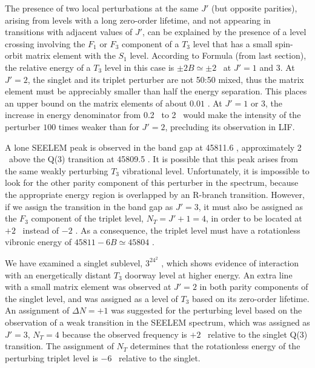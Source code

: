 The presence of two local perturbations at the same $J'$ (but opposite
parities), arising from levels with a long zero-order lifetime, and
not appearing in transitions with adjacent values of $J'$, can be
explained by the presence of a level crossing involving the $F_1$ or
$F_3$ component of a $T_3$ level that has a small spin-orbit matrix
element with the $S_1$ level.  According to Formula (from last
section), the relative energy of a $T_3$ level in this case is $\pm 2B
\simeq \pm 2$ \rcm\ at $J'=1$ and $3$.  At $J'=2$, the singlet and its
triplet perturber are not 50:50 mixed, thus the matrix element must be
appreciably smaller than half the energy separation.  This places an
upper bound on the matrix elements of about $0.01$ \rcm.  At $J'=1$ or
$3$, the increase in energy denominator from 0.2 \rcm\ to 2 \rcm\
would make the intensity of the perturber $100$ times weaker than for
$J'=2$, precluding its observation in LIF.

A lone SEELEM peak is observed in the band gap at 45811.6 \rcm,
approximately 2 \rcm\ above the Q(3) transition at 45809.5 \rcm.  It
is possible that this peak arises from the same weakly perturbing
$T_3$ vibrational level.  Unfortunately, it is impossible to look for
the other parity component of this perturber in the spectrum, because
the appropriate energy region is overlapped by an R-branch transition.
However, if we assign the transition in the band gap as $J'=3$, it
must also be assigned as the $F_3$ component of the triplet level,
$N_T=J'+1=4$, in order to be located at $+2$ \rcm\ instead of $-2$
\rcm.  As a consequence, the triplet level must have a rotationless
vibronic energy of $45811 - 6B \simeq 45804$ \rcm.

We have examined a singlet sublevel, $3^24^2$ , which shows
evidence of interaction with an energetically distant $T_3$ doorway
level at higher energy.  An extra line with a small matrix element was
observed at $J'=2$ in both parity components of the singlet level, and
was assigned as a level of $T_3$ based on its zero-order lifetime.  An
assignment of $\Delta N=+1$ was suggested for the perturbing level
based on the observation of a weak transition in the SEELEM spectrum,
which was assigned as $J'=3$, $N_T=4$ because the observed frequency
is $+2$ \rcm\ relative to the singlet Q(3) transition.  The assignment
of $N_T$ determines that the rotationless energy of the perturbing
triplet level is $-6$ \rcm\ relative to the singlet.


